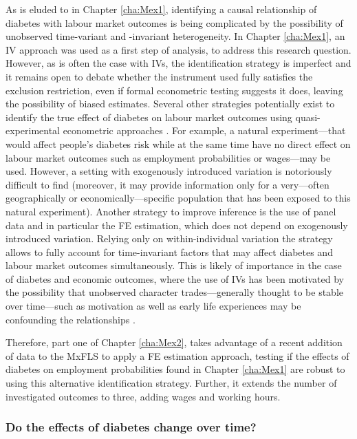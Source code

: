 As is eluded to in Chapter \ref{cha:Mex1}, identifying a causal relationship of diabetes with labour market outcomes is being complicated by the possibility of unobserved time-variant and -invariant heterogeneity. In Chapter \ref{cha:Mex1}, an \ac{IV} approach was used as a first step of analysis, to address this research question. However, as is often the case with \acp{IV}, the identification strategy is imperfect and it remains open to debate whether the instrument used fully satisfies the exclusion restriction, even if formal econometric testing suggests it does, leaving the possibility of biased estimates. Several other strategies potentially exist to identify the true effect of diabetes on labour market outcomes using quasi-experimental econometric approaches \parencite{Antonakis2012}. For example, a natural experiment---that would affect people's diabetes risk while at the same time have no direct effect on labour market outcomes such as employment probabilities or wages---may be used. However, a setting with exogenously introduced variation is notoriously difficult to find (moreover, it  may provide information only for a very---often geographically or economically---specific population that has been exposed to this natural experiment). Another strategy to improve inference is the use of panel data and in particular the \ac{FE} estimation, which does not depend on exogenously introduced variation. Relying only on within-individual variation the strategy allows to fully account for time-invariant factors that may affect diabetes and labour market outcomes simultaneously. This is likely of importance in the case of diabetes and economic outcomes, where the use of \ac{IV}s has been motivated by the possibility that unobserved character trades---generally thought to be stable over time---such as motivation as well as early life experiences may be confounding the relationships \parencite{Seuring2015}.

Therefore, part one of Chapter \ref{cha:Mex2}, takes advantage of a recent addition of data to the \ac{MxFLS} to apply a \ac{FE} estimation approach, testing if the effects of diabetes on employment probabilities found in Chapter \ref{cha:Mex1} are robust to using this alternative identification strategy. Further, it extends the number of investigated outcomes to three, adding wages and working hours.

\subsubsection{Do the effects of diabetes change over time?}

